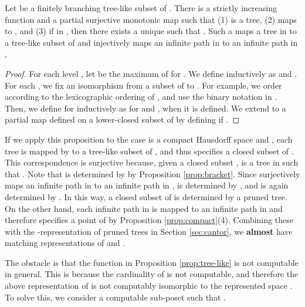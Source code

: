 \documentclass{eptcs-modified}
\begin{document}
  \begin{proposition}\label{prop:tree-like}
   Let  be a finitely branching tree-like subset of .
   There is a strictly increasing function 
and a partial surjective monotonic map  such that
(1)  is a tree,  (2)  maps
 to , and
(3) if  in , then
there exists a unique  such that .
Such a  maps a tree in  to a tree-like subset of 
and injectively maps an infinite path in  to an infinite path in ,
 \end{proposition}
 \begin{proof}
 For each level , let  be the maximum of  for .
    We define  inductively as  and
    .
For each ,  we fix an isomorphism  from a subset of
 to .
For example,  we order 
according to the lexicographic ordering of , and use the
binary notation in .
Then, we define
 for  inductively as
 for  and , when it is defined.  We extend  to a partial map defined on a lower-closed subset of 
by defining  if .
\end{proof}

If we apply this proposition to the case  is a compact Hausdorff space and
,  each tree 
is mapped by  to a tree-like subset of , and thus
\textsf{}specifies a closed subset  of . This correspondence is surjective
because, given a closed subset ,   is a tree in 
such that
.
Note that  is determined by  by Proposition \ref{prop:bracket}.
Since  surjectively maps an infinite path in  to an infinite path in ,
 is determined by , and is again determined by .
In this way, a closed subset of  is determined by a pruned tree.
On the other hand, each infinite path in  is mapped to an infinite path in
 and therefore  specifies
 a point of  by Proposition  \ref{prop:compact}(4).
Combining these with the -representation of pruned trees in Section \ref{sec:cantor},
we {\bf almost} have matching representations of  and .

The obstacle is that the function  in Proposition \ref{prop:tree-like} is not computable in general. This is because the cardinality of
 is not computable, and therefore
the above representation of  is not computably isomorphic to the represented space  .
To solve this, we consider a computable sub-poset 
such that .
\end{document}
